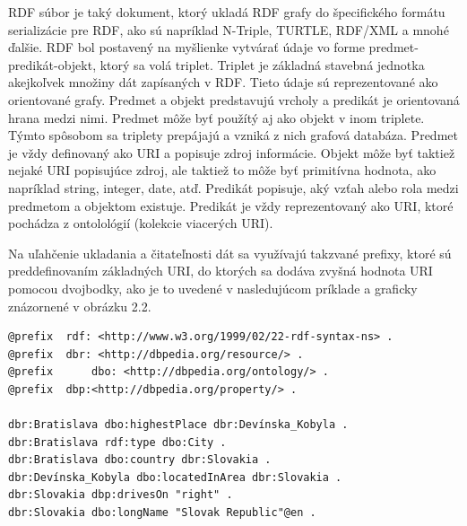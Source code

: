 \documentclass[12pt, a4paper, oneside]{book}
\begin{document}



RDF súbor je taký dokument, ktorý ukladá RDF grafy do špecifického formátu serializácie pre RDF, ako sú napríklad N-Triple, TURTLE, RDF/XML a mnohé ďalšie. RDF bol postavený na myšlienke vytvárať údaje vo forme predmet-predikát-objekt, ktorý sa volá triplet. Triplet je základná stavebná jednotka akejkoľvek množiny dát zapísaných v RDF. Tieto údaje sú reprezentované ako orientované grafy. Predmet a objekt predstavujú vrcholy a predikát je orientovaná hrana medzi nimi. Predmet môže byť použítý aj ako objekt v inom triplete. Týmto spôsobom sa triplety prepájajú a vzniká z nich grafová databáza. Predmet je vždy definovaný ako URI a popisuje zdroj informácie. Objekt môže byť taktiež nejaké URI popisujúce zdroj, ale taktiež to môže byť primitívna hodnota, ako napríklad string, integer, date, atď. Predikát popisuje, aký vzťah alebo rola medzi predmetom a objektom existuje. Predikát je vždy reprezentovaný ako URI, ktoré pochádza z ontolológií (kolekcie viacerých URI).


Na uľahčenie ukladania a čitateľnosti dát sa využívajú takzvané prefixy, ktoré sú preddefinovaním základných URI, do ktorých sa dodáva zvyšná hodnota URI pomocou dvojbodky, ako je to uvedené v nasledujúcom príklade a graficky znázornené v obrázku 2.2.
\begin{verbatim}
@prefix  rdf: <http://www.w3.org/1999/02/22-rdf-syntax-ns> .
@prefix	 dbr: <http://dbpedia.org/resource/> .
@prefix 	 dbo: <http://dbpedia.org/ontology/> .
@prefix  dbp:<http://dbpedia.org/property/> .

dbr:Bratislava dbo:highestPlace dbr:Devínska_Kobyla .
dbr:Bratislava rdf:type dbo:City .
dbr:Bratislava dbo:country dbr:Slovakia .
dbr:Devínska_Kobyla dbo:locatedInArea dbr:Slovakia .
dbr:Slovakia dbp:drivesOn "right" .
dbr:Slovakia dbo:longName "Slovak Republic"@en .
\end{verbatim}
\end{document}
